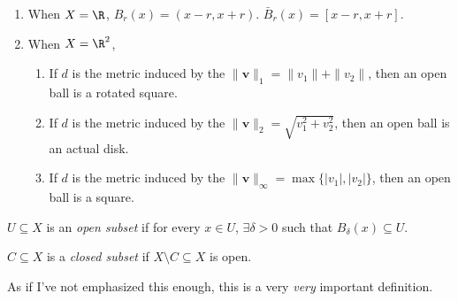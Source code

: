 \documentclass[a4paper]{article}
\begin{document}
\begin{eg}\leavevmode
  \begin{enumerate}
    \item When $X = \R$, $B_r(x) = (x - r, x + r)$. $\bar{B}_r(x) = [x - r, x + r]$.
    \item When $X = \R^2$,
      \begin{enumerate}
        \item If $d$ is the metric induced by the $\|\mathbf{v}\|_1 = \|v_1\| + \|v_2\|$, then an open ball is a rotated square.
          \begin{center}
          \end{center}
        \item If $d$ is the metric induced by the $\|\mathbf{v}\|_2 = \sqrt{v_1^2 + v_2^2}$, then an open ball is an actual disk.
          \begin{center}
          \end{center}

        \item If $d$ is the metric induced by the $\|\mathbf{v}\|_\infty = \max\{|v_1|, |v_2|\}$, then an open ball is a square.
          \begin{center}
          \end{center}
      \end{enumerate}
  \end{enumerate}
\end{eg}
\begin{defi}
  $U\subseteq X$ is an \emph{open subset} if for every $x\in U$, $\exists \delta > 0$ such that $B_\delta(x) \subseteq U$.

  $C\subseteq X$ is a \emph{closed subset} if $X\setminus C \subseteq X$ is open.
\end{defi}
As if I've not emphasized this enough, this is a very \emph{very} important definition.
\end{document}
